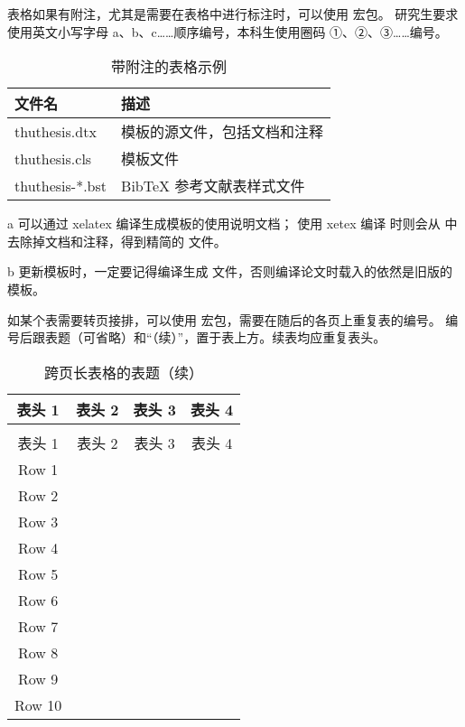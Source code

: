 表格如果有附注，尤其是需要在表格中进行标注时，可以使用  宏包。
研究生要求使用英文小写字母 a、b、c……顺序编号，本科生使用圈码 ①、②、③……编号。

\begin{table}
  \centering
  \begin{threeparttable}[c]
    \caption{带附注的表格示例}
    \label{tab:three-part-table}
    \begin{tabular}{ll}
      \toprule
      文件名                 & 描述                         \\
      \midrule
      thuthesis.dtx\tnote{a} & 模板的源文件，包括文档和注释 \\
      thuthesis.cls\tnote{b} & 模板文件                     \\
      thuthesis-*.bst        & BibTeX 参考文献表样式文件    \\
      \bottomrule
    \end{tabular}
    \begin{tablenotes}
      \item [a] 可以通过 xelatex 编译生成模板的使用说明文档；
        使用 xetex 编译  时则会从  中去除掉文档和注释，得到精简的  文件。
      \item [b] 更新模板时，一定要记得编译生成  文件，否则编译论文时载入的依然是旧版的模板。
    \end{tablenotes}
  \end{threeparttable}
\end{table}

如某个表需要转页接排，可以使用  宏包，需要在随后的各页上重复表的编号。
编号后跟表题（可省略）和“（续）”，置于表上方。续表均应重复表头。

\begin{longtable}{cccc}
    \caption{跨页长表格的表题} \\
    \toprule
    表头 1 & 表头 2 & 表头 3 & 表头 4 \\
    \midrule
  \endfirsthead
    \caption[]{跨页长表格的表题（续）} \\
    \toprule
    表头 1 & 表头 2 & 表头 3 & 表头 4 \\
    \midrule
  \endhead
    \bottomrule
  \endfoot
  Row 1  & & & \\
  Row 2  & & & \\
  Row 3  & & & \\
  Row 4  & & & \\
  Row 5  & & & \\
  Row 6  & & & \\
  Row 7  & & & \\
  Row 8  & & & \\
  Row 9  & & & \\
  Row 10 & & & \\
\end{longtable}



